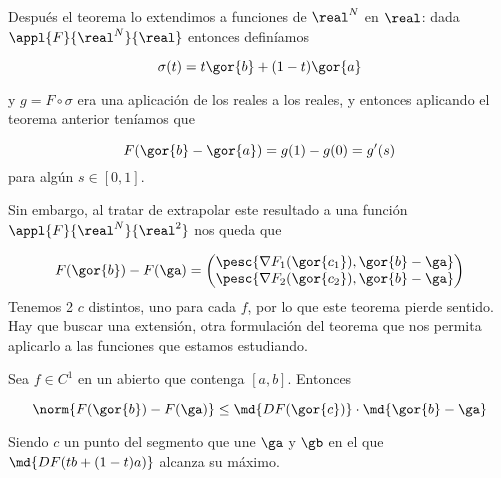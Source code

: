 Después el teorema lo extendimos a funciones de $\real^N$ en $\real$: dada $\appl{F}{\real^N}{\real}$ entonces definíamos

 \[ \sigma(t)  = t\gor{b}+(1-t)\gor{a} \]

 y $g = F\circ \sigma$ era una aplicación de los reales a los reales, y entonces aplicando el teorema anterior teníamos que

 \[ F(\gor{b}-\gor{a}) = g(1)-g(0)  = g'(s) \]
 para algún $s\in[0,1]$.

Sin embargo, al tratar de extrapolar este resultado a una función $\appl{F}{\real^N}{\real^2}$ nos queda que

 \[ F(\gor{b})-F(\ga) = \begin{pmatrix}
                         \pesc{\nabla F_1(\gor{c_1}),{\gor{b}-\ga}}\\
                         \pesc{\nabla F_2(\gor{c_2}),\gor{b}-\ga}
                        \end{pmatrix}
 \]
  Tenemos 2 $c$ distintos, uno para cada $f$, por lo que este teorema pierde sentido. Hay que buscar una extensión, otra formulación del teorema que nos permita aplicarlo a las funciones que estamos estudiando.

  \begin{theorem} 
  \label{thmTVM}
  Sea $f \in C^1$ en un abierto que contenga $[a,b]$. Entonces

  \[ \norm{F(\gor{b})-F(\ga)} \leq \md{DF(\gor{c})} \cdot \md{\gor{b}-\ga} \]

  Siendo $c$ un punto del segmento que une $\ga$ y $\gb$ en el que $\md{DF(tb+(1-t)a)}$ alcanza su máximo.
  \end{theorem}

